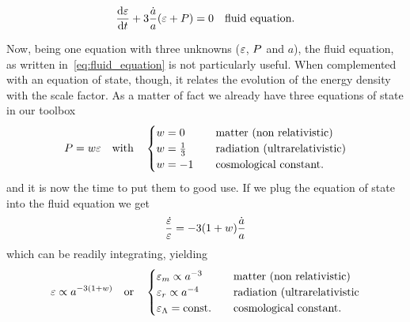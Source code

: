 \begin{align}\label{eq:fluid_equation}
  \dv{\varepsilon}{t} + 3\frac{\dot{a}}{a}(\varepsilon + P) = 0 \quad\text{fluid equation}.
\end{align}

Now, being one equation with three unknowns ($\varepsilon$, $P$ and $a$), the
fluid equation, as written in~\eqref{eq:fluid_equation} is not particularly useful.
When complemented with an equation of state, though, it relates the evolution of the
energy density with the scale factor. As a matter of fact we already have three
equations of state in our toolbox
\begin{align*}
  P = w \varepsilon
  \quad \text{with} \quad
  \begin{cases}
    w = 0 & \quad \text{matter (non relativistic)}\\
    w = \frac{1}{3} & \quad \text{radiation (ultrarelativistic)}\\
    w = -1 & \quad \text{cosmological constant}.
  \end{cases}
\end{align*}
and it is now the time to put them to good use. If we plug the equation of state
into the fluid equation we get
\begin{align*}
  \frac{\dot{\varepsilon}}{\varepsilon} = -3(1 + w) \frac{\dot{a}}{a}
\end{align*}
which can be readily integrating, yielding
\begin{align*}
  \varepsilon \propto a^{-3(1 + w)}
  \quad \text{or} \quad
  \begin{cases}
    \varepsilon_m \propto a^{-3} & \quad \text{matter (non relativistic)}\\
    \varepsilon_r \propto a^{-4} & \quad \text{radiation (ultrarelativistic}\\
    \varepsilon_\Lambda = \text{const.} & \quad \text{cosmological constant}.
  \end{cases}
\end{align*}

